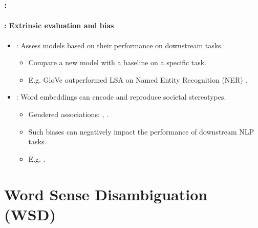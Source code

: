 \documentclass[xcolor=table]{beamer}
\begin{document}
\begin{frame}
	\frametitle{\insertshortsubtitle: \insertsection}
	\framesubtitle{\insertsubsection: Extrinsic evaluation and bias}
	
	\begin{itemize}
		\item {}: Assess models based on their performance on downstream tasks.
		\begin{itemize}
			\item Compare a new model with a baseline on a specific task.
			\item E.g. GloVe outperformed LSA on Named Entity Recognition (NER) \cite{2014-pennington-al}.
		\end{itemize}
		\item {}: Word embeddings can encode and reproduce societal stereotypes.
		\begin{itemize}
			\item Gendered associations: ,  \cite{2017-caliskan-al}.
			\item Such biases can negatively impact the performance of downstream NLP tasks.
			\item E.g. .
		\end{itemize}
	\end{itemize}
	
\end{frame}


\section{Word Sense Disambiguation (WSD)}
\end{document}
